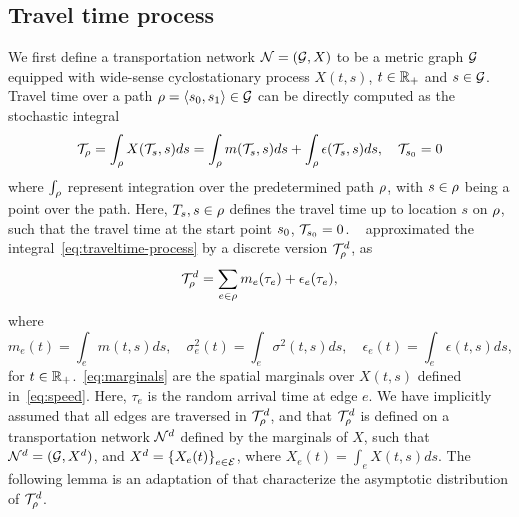 \documentclass[12pt]{article}
\begin{document}
{{%
\subsection{Travel time process}\label{sec:traveltime-process}
We first define a transportation network $\mathcal{N} = (\mathcal{G}, X)$ to be a metric graph $\mathcal{G}$ equipped with wide-sense cyclostationary process $X(t, s)$, $t \in \mathbb{R}_+$ and $s \in \mathcal{G}$. Travel time over a path $\rho = {\langle {s_0},{ s_1}\rangle } \in \mathcal{G}$ can be directly computed as the stochastic integral 
\begin{equation}
    \label{eq:traveltime-process}
\mathcal{T}_\rho = \int_\rho X(\mathcal{T}_s, s)ds = \int_\rho m(\mathcal{T}_s, s)ds + \int_{\rho} \epsilon(\mathcal{T}_s,s)ds, \quad \mathcal{T}_{s_0} = 0
\end{equation}
where $\int_\rho$ represent integration over the predetermined path $\rho$, with $s \in \rho$ being a point over the path. Here, $T_s, s \in \rho$ defines the travel time up to location $s$ on $\rho$, such that the travel time at the start point ${s_0}$, $\mathcal{T}_{s_0} =0$. ~\cite{elmasri2020predictive} approximated the integral~\eqref{eq:traveltime-process} by a discrete version $\mathcal{T}_\rho^d$, as 
\[\mathcal{T}^d_\rho = \sum_{e \in \rho} m_e(\tau_e) + \epsilon_e(\tau_e), \]
where 
\begin{equation}\label{eq:marginals}
    m_e(t) = \int_e m(t,s)ds, \quad \sigma^2_e(t) = \int_e \sigma^2(t,s)ds, \quad \epsilon_e(t) = \int_e \epsilon(t,s)ds,
\end{equation}
for $t \in \mathbb{R}_+$.~\eqref{eq:marginals} are the spatial marginals over $X(t,s)$ defined in~\eqref{eq:speed}. Here, $\tau_e$ is the random arrival time at edge $e$. We have implicitly assumed that all edges are traversed in $\mathcal{T}_\rho^d$, and that $\mathcal{T}_\rho^d$ is defined on a transportation network $\mathcal{N}^d$ defined by the marginals of $X$, such that $\mathcal{N}^d = (\mathcal{G}, X^d)$, and $X^d = \left\{X_e(t)\right\}_{e \in \mathcal{E}}$, where $X_e(t) = \int_e X(t,s)ds$. The following lemma is an adaptation of \citet[Lem~6, Them.~6]{elmasri2020predictive} that characterize the asymptotic distribution of $\mathcal{T}_\rho^d$. 

}}
\end{document}
